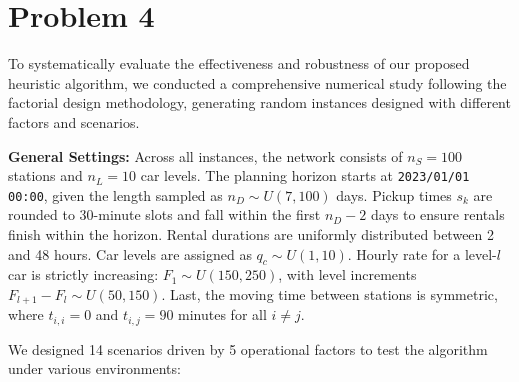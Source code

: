 \documentclass[10pt,a4paper]{article}
\begin{document}
\section*{Problem 4}
To systematically evaluate the effectiveness and robustness of our proposed heuristic algorithm, we conducted a comprehensive numerical study following the factorial design methodology, generating random instances designed with different factors and scenarios.

\textbf{General Settings:} 
Across all instances, the network consists of $n_S=100$ stations and $n_L=10$ car levels. The planning horizon starts at \texttt{2023/01/01 00:00}, given the length sampled as $n_D \sim U(7, 100)$ days. Pickup times $s_k$ are rounded to 30-minute slots and fall within the first $n_D-2$ days to ensure rentals finish within the horizon. Rental durations are uniformly distributed between 2 and 48 hours. Car levels are assigned as $q_c \sim U(1, 10)$. Hourly rate for a level-$l$ car is strictly increasing: $F_1 \sim U(150, 250)$, with level increments $F_{l+1}-F_l \sim U(50, 150)$. Last, the moving time between stations is symmetric, where $t_{i,i}=0$ and $t_{i,j}=90$ minutes for all $i \neq j$.

\vspace{0.1cm}
We designed 14 scenarios driven by 5 operational factors to test the algorithm under various environments:
\end{document}

